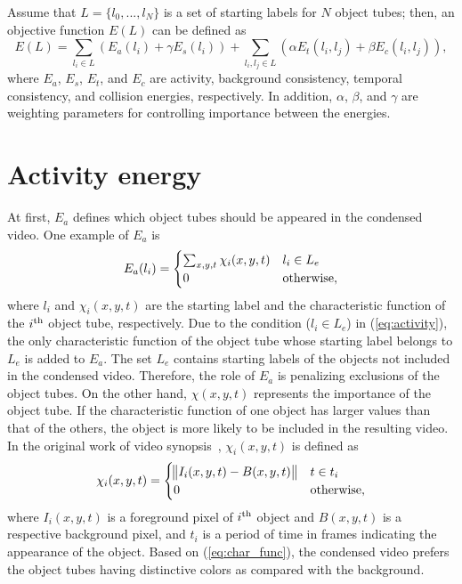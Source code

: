 \documentclass[11pt]{hyu_thesis}
\begin{document}
Assume that $L=\{l_0,...,l_N\}$ is a set of starting labels for $N$ object tubes; then, an objective function $E(L)$ can be defined as
\begin{equation}
\label{eq:basic_form}
E(L)=\sum_{l_i \in L} \left( E_a(l_i) + \gamma E_s(l_i) \right) + \sum_{l_i,l_j \in L} \left( \alpha E_t(l_i, l_j) + \beta E_c(l_i, l_j) \right),
\end{equation}
where $E_a$, $E_s$, $E_t$, and $E_c$ are activity, background consistency, temporal consistency, and collision energies, respectively. In addition, $\alpha$, $\beta$, and $\gamma$ are weighting parameters for controlling importance between the energies.

\section{Activity energy}
At first, $E_a$ defines which object tubes should be appeared in the condensed video. One example of $E_a$ is
\begin{equation}
\label{eq:activity}
E_a(l_i) =
\begin{cases}
\sum_{x,y,t} \chi_i (x,y,t) & l_i \in L_e \\
0 & \rm{otherwise},
\end{cases}
\end{equation}
where $l_i$ and $\chi_i (x,y,t)$ are the starting label and the characteristic function of the $i^{\rm{th}}$ object tube, respectively. Due to the condition ($l_i \in L_e$) in (\ref{eq:activity}), the only characteristic function of the object tube whose starting label belongs to $L_e$ is added to $E_a$. The set $L_e$ contains starting labels of the objects not included in the condensed video. Therefore, the role of $E_a$ is penalizing exclusions of the object tubes. On the other hand, $\chi (x,y,t)$ represents the importance of the object tube. If the characteristic function of one object has larger values than that of the others, the object is more likely to be included in the resulting video. In the original work of video synopsis~\cite{Rav-Acha2006,Pritch2007,Pritch2008}, $\chi_i (x,y,t)$ is defined as
\begin{equation}
\label{eq:char_func}
\chi_i(x,y,t)=
\begin{cases}
\norm{I_i(x,y,t)-B(x,y,t)} & t \in t_i\\
0 & \rm{otherwise},
\end{cases}
\end{equation}
where $I_i(x,y,t)$ is a foreground pixel of $i^{\rm{th}}$ object and $B(x,y,t)$ is a respective background pixel, and $t_i$ is a period of time in frames indicating the appearance of the object. Based on (\ref{eq:char_func}), the condensed video prefers the object tubes having distinctive colors as compared with the background. 
\end{document}
